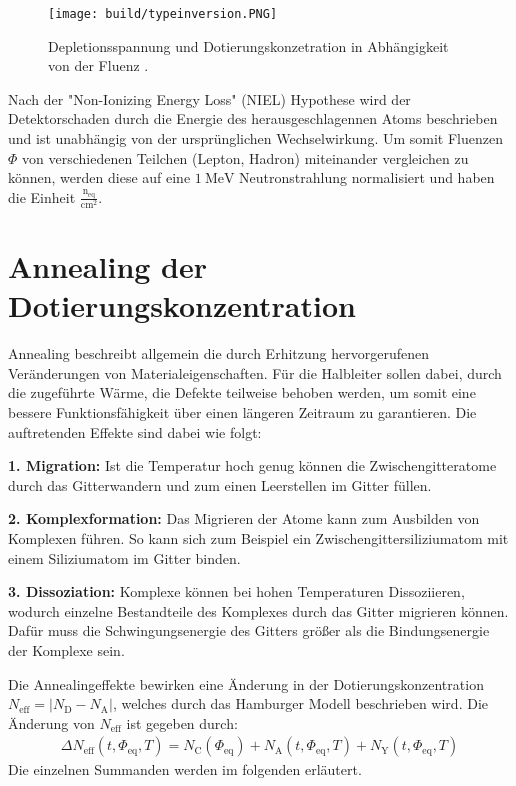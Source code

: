 \begin{figure}
    \texttt{[image: build/typeinversion.PNG]}
\caption{Depletionsspannung und Dotierungskonzetration in Abhängigkeit von der Fluenz \cite{semiconductor}.}
\label{fig:typeinversion}
\end{figure}

Nach der "Non-Ionizing Energy Loss" (NIEL) Hypothese wird der Detektorschaden durch die Energie des herausgeschlagennen
Atoms beschrieben und ist unabhängig von der ursprünglichen Wechselwirkung.
Um somit Fluenzen $ \Phi$ von verschiedenen Teilchen (Lepton, Hadron) miteinander vergleichen zu können, werden diese
auf eine $\SI{1}{\mega\eV}$ Neutronstrahlung normalisiert und haben die Einheit $\mathrm{\frac{n_{\mathrm{eq}}}{cm^2}}$.


\section{Annealing der Dotierungskonzentration}
Annealing beschreibt allgemein die durch Erhitzung hervorgerufenen Veränderungen von Materialeigenschaften. Für die
Halbleiter sollen dabei, durch die zugeführte Wärme, die Defekte teilweise behoben werden, um somit eine
bessere Funktionsfähigkeit über einen längeren Zeitraum zu garantieren. Die auftretenden Effekte sind dabei wie folgt:

\textbf{1. Migration:} Ist die Temperatur hoch genug können die Zwischengitteratome durch das Gitterwandern und
zum einen Leerstellen im Gitter füllen.

\textbf{2. Komplexformation:} Das Migrieren der Atome kann zum Ausbilden von Komplexen führen. So kann sich zum Beispiel ein
Zwischengittersiliziumatom mit einem Siliziumatom im Gitter binden.

\textbf{3. Dissoziation:} Komplexe können bei hohen Temperaturen Dissoziieren, wodurch einzelne Bestandteile des Komplexes
durch das Gitter migrieren können. Dafür muss die Schwingungsenergie des Gitters größer als die Bindungsenergie der Komplexe sein.

Die Annealingeffekte bewirken eine Änderung in der Dotierungskonzentration $N_{\mathrm{eff}}= |N_{\mathrm{D}}-N_{\mathrm{A}}|$, welches durch das Hamburger Modell beschrieben wird.
Die Änderung von $N_{\mathrm{eff}}$ ist gegeben durch:
\begin{align}
  \Delta N_{\mathrm{eff}}(t, \Phi_{\mathrm{eq}}, T)   = N_{\mathrm{C}}(\Phi_{\mathrm{eq}}) + N_{\mathrm{A}}(t, \Phi_{\mathrm{eq}}, T) + N_{\mathrm{Y}}(t, \Phi_{\mathrm{eq}}, T) \label{eqn:N_eff}
\end{align}
Die einzelnen Summanden werden im folgenden erläutert.

